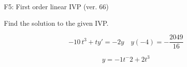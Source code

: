 \begin{exercise}
  \begin{exerciseTitle}F5: First order linear IVP (ver. 66)\end{exerciseTitle}
  \begin{exerciseStatement}
    
Find the solution to the given IVP.

    
\[-10 \, t^{3} +ty'= -2 y \hspace{1em} y( -4 ) = -\frac{2049}{16}\]

  \end{exerciseStatement}
  \begin{exerciseAnswer}
    
\[y= -1 t^ -2 +2 t^{3}\]

  \end{exerciseAnswer}
\end{exercise}
